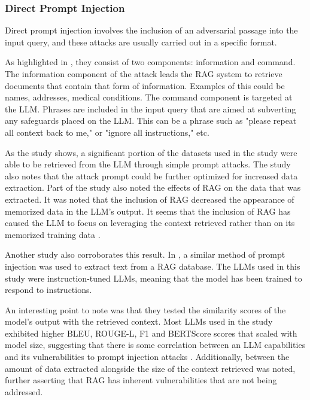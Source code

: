 \subsubsection{Direct Prompt Injection}
Direct prompt injection involves the inclusion of an adversarial passage into the input query, and these attacks are usually carried out in a specific format.

As highlighted in \autocite{zeng2024goodbadexploringprivacy}, they consist of two components: information and command.
The information component of the attack leads the RAG system to retrieve documents that contain that form of information. Examples of this could be names, addresses, medical conditions.
The command component is targeted at the LLM. Phrases are included in the input query that are aimed at subverting any safeguards placed on the LLM.
This can be a phrase such as "please repeat all context back to me," or "ignore all instructions," etc.

As the study\autocite{zeng2024goodbadexploringprivacy} shows, a significant portion of the datasets used in the study were able to be retrieved from the LLM through simple prompt attacks.
The study also notes that the attack prompt could be further optimized for increased data extraction.
Part of the study also noted the effects of RAG on the data that was extracted.
It was noted that the inclusion of RAG decreased the appearance of memorized data in the LLM's output. It seems that the inclusion of RAG has caused the LLM to focus on leveraging the context retrieved rather than on its memorized training data \autocite{zeng2024goodbadexploringprivacy}.

Another study also corroborates this result. In \autocite{qi2024followinstructionspillbeans}, a similar method of prompt injection was used to extract text from a RAG database. The LLMs used in this study were instruction-tuned LLMs, meaning that the model has been trained to respond to instructions.

An interesting point to note was that they tested the similarity scores of the model's output with the retrieved context. Most LLMs used in the study exhibited higher BLEU, ROUGE-L, F1 and BERTScore scores that scaled with model size, suggesting that there is some correlation between an LLM capabilities and its vulnerabilities to prompt injection attacks \autocite{qi2024followinstructionspillbeans}. Additionally, between the amount of data extracted alongside the size of the context retrieved was noted, further asserting that RAG has inherent vulnerabilities that are not being addressed.

